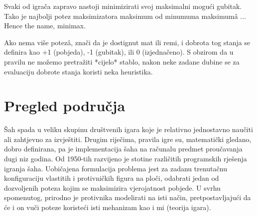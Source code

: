 \documentclass[journal]{IEEEtran}
\begin{document}
Svaki od igrača zapravo nastoji minimizirati svoj maksimalni mogući gubitak.
Tako je najbolji potez maksimizatora maksimum od minumuma maksimumâ ...
Hence the name, minimax.

Ako nema više potezâ, znači da je dostignut mat ili remi, i dobrota tog stanja
se definira kao +1 (pobjeda), -1 (gubitak), ili 0 (izjednačeno). S obzirom da
u pravilu ne možemo pretražiti *cijelo* stablo, nakon neke zadane dubine se za
evaluaciju dobrote stanja koristi neka heuristika.

\section{Pregled područja}
Šah spada u veliku skupinu društvenih igara koje je relativno jednostavno naučiti ali zahtjevno za izvještiti. Drugim riječima, pravila igre su, matematički gledano, dobro definirana, pa je implementacija šaha na računalu predmet proučavanja dugi niz godina. Od 1950-tih razvijeno je stotine različitih programskih rješenja igranja šaha. Uobičajena formulacija problema jest za zadanu trenutačnu konfiguraciju vlastitih i protivničkih figura na ploči, odabrati jedan od dozvoljenih poteza kojim se maksimizira vjerojatnost pobjede. U svrhu spomenutog, prirodno je protivnika modelirati na isti način, pretpostavljajući da će i on vuči poteze koristeći isti mehanizam kao i mi (teorija igara).
\end{document}
